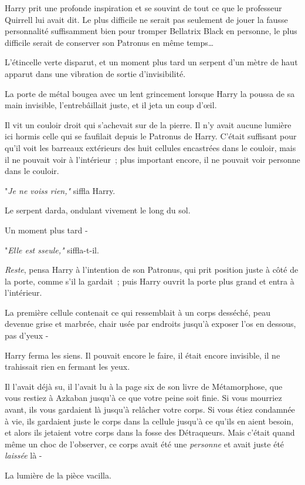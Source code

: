 Harry prit une profonde inspiration et se souvint de tout ce que le professeur Quirrell lui avait dit. Le plus difficile ne serait pas seulement de jouer la fausse personnalité suffisamment bien pour tromper Bellatrix Black en personne, le plus difficile serait de conserver son Patronus en même temps…

L'étincelle verte disparut, et un moment plus tard un serpent d'un mètre de haut apparut dans une vibration de sortie d'invisibilité.

La porte de métal bougea avec un lent grincement lorsque Harry la poussa de sa main invisible, l'entrebâillait juste, et il jeta un coup d'œil.

Il vit un couloir droit qui s'achevait sur de la pierre. Il n'y avait aucune lumière ici hormis celle qui se faufilait depuis le Patronus de Harry. C'était suffisant pour qu'il voit les barreaux extérieurs des huit cellules encastrées dans le couloir, mais il ne pouvait voir à l'intérieur~; plus important encore, il ne pouvait voir personne dans le couloir.

"\emph{Je ne voiss rien,"} siffla Harry.

Le serpent darda, ondulant vivement le long du sol.

Un moment plus tard -

"\emph{Elle est sseule,"} siffla-t-il.

\emph{Reste}, pensa Harry à l'intention de son Patronus, qui prit position juste à côté de la porte, comme s'il la gardait~; puis Harry ouvrit la porte plus grand et entra à l'intérieur.

La première cellule contenait ce qui ressemblait à un corps desséché, peau devenue grise et marbrée, chair usée par endroits jusqu'à exposer l'os en dessous, pas d'yeux -

Harry ferma les siens. Il pouvait encore le faire, il était encore invisible, il ne trahissait rien en fermant les yeux.

Il l'avait déjà su, il l'avait lu à la page six de son livre de Métamorphose, que vous restiez à Azkaban jusqu'à ce que votre peine soit finie. Si vous mourriez avant, ils vous gardaient là jusqu'à relâcher votre corps. Si vous étiez condamnée à vie, ils gardaient juste le corps dans la cellule jusqu'à ce qu'ils en aient besoin, et alors ils jetaient votre corps dans la fosse des Détraqueurs. Mais c'était quand même un choc de l'observer, ce corps avait été une \emph{personne} et avait juste été \emph{laissée} là -

La lumière de la pièce vacilla.

